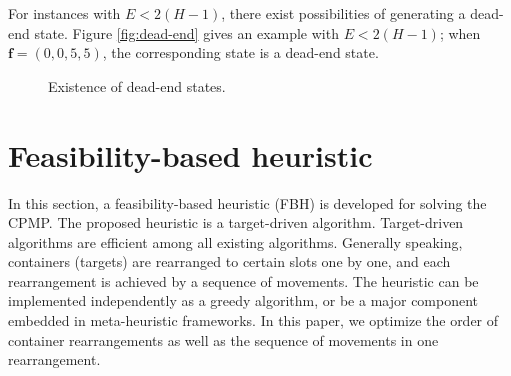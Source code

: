 \documentclass[review,3p,times,12pt,number]{elsarticle}\usepackage{amsmath}\usepackage{amssymb}
\begin{document}
For instances with $E<2(H-1)$, there exist possibilities of generating a dead-end state.
Figure \ref{fig:dead-end} gives an example with $E<2(H-1)$; when $\boldsymbol f=(0,0,5,5)$, the corresponding state is a dead-end state.
\begin{figure}[htbp]
\centering
{}
\caption{Existence of dead-end states.}
\end{figure}

\section{Feasibility-based heuristic}
\label{sec:fbh}

In this section, a feasibility-based heuristic (FBH) is developed for solving the CPMP\@. The proposed heuristic is a target-driven algorithm. Target-driven algorithms \citep{exp2012,wang2015} are efficient among all existing algorithms. Generally speaking, containers (targets) are rearranged to certain slots one by one, and each rearrangement is achieved by a sequence of movements.
The heuristic can be implemented independently as a greedy algorithm, or be a major component embedded in meta-heuristic frameworks.
In this paper, we optimize the order of container rearrangements as well as the sequence of movements in one rearrangement.
\end{document}
